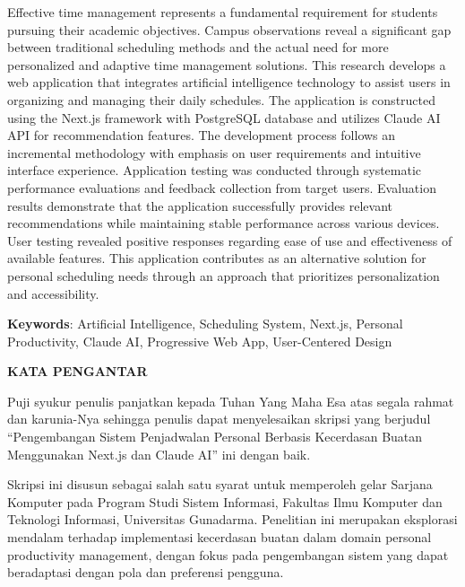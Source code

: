 \documentclass[12pt,a4paper,oneside]{report}
\begin{document}
\begin{singlespace}
Effective time management represents a fundamental requirement for students pursuing their academic objectives. Campus observations reveal a significant gap between traditional scheduling methods and the actual need for more personalized and adaptive time management solutions. This research develops a web application that integrates artificial intelligence technology to assist users in organizing and managing their daily schedules. The application is constructed using the Next.js framework with PostgreSQL database and utilizes Claude AI API for recommendation features. The development process follows an incremental methodology with emphasis on user requirements and intuitive interface experience. Application testing was conducted through systematic performance evaluations and feedback collection from target users. Evaluation results demonstrate that the application successfully provides relevant recommendations while maintaining stable performance across various devices. User testing revealed positive responses regarding ease of use and effectiveness of available features. This application contributes as an alternative solution for personal scheduling needs through an approach that prioritizes personalization and accessibility.
\end{singlespace}

\vspace{1cm}
\noindent\textbf{Keywords}: Artificial Intelligence, Scheduling System, Next.js, Personal Productivity, Claude AI, Progressive Web App, User-Centered Design

\newpage
{}
\begin{center}
{\Large\bfseries KATA PENGANTAR}
\end{center}

\vspace{1cm}

Puji syukur penulis panjatkan kepada Tuhan Yang Maha Esa atas segala rahmat dan karunia-Nya sehingga penulis dapat menyelesaikan skripsi yang berjudul ``Pengembangan Sistem Penjadwalan Personal Berbasis Kecerdasan Buatan Menggunakan Next.js dan Claude AI'' ini dengan baik.

Skripsi ini disusun sebagai salah satu syarat untuk memperoleh gelar Sarjana Komputer pada Program Studi Sistem Informasi, Fakultas Ilmu Komputer dan Teknologi Informasi, Universitas Gunadarma. Penelitian ini merupakan eksplorasi mendalam terhadap implementasi kecerdasan buatan dalam domain personal productivity management, dengan fokus pada pengembangan sistem yang dapat beradaptasi dengan pola dan preferensi pengguna.
\end{document}
